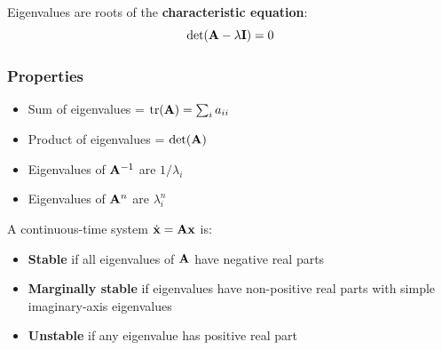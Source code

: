 Eigenvalues are roots of the \textbf{characteristic equation}:
\begin{equation}
\det(\mathbf{A} - \lambda\mathbf{I}) = 0
\end{equation}



\subsubsection{Properties}
\begin{itemize}
    \item Sum of eigenvalues = $\operatorname{tr}(\mathbf{A}) = \sum_i a_{ii}$
    \item Product of eigenvalues = $\det(\mathbf{A})$
    \item Eigenvalues of $\mathbf{A}^{-1}$ are $1/\lambda_i$
    \item Eigenvalues of $\mathbf{A}^n$ are $\lambda_i^n$
\end{itemize}

\begin{keyconceptbox}[title=Stability and Eigenvalues]
A continuous-time system $\dot{\mathbf{x}} = \mathbf{A}\mathbf{x}$ is:
\begin{itemize}
    \item \textbf{Stable} if all eigenvalues of $\mathbf{A}$ have negative real parts
    \item \textbf{Marginally stable} if eigenvalues have non-positive real parts with simple imaginary-axis eigenvalues
    \item \textbf{Unstable} if any eigenvalue has positive real part
\end{itemize}
\end{keyconceptbox}

